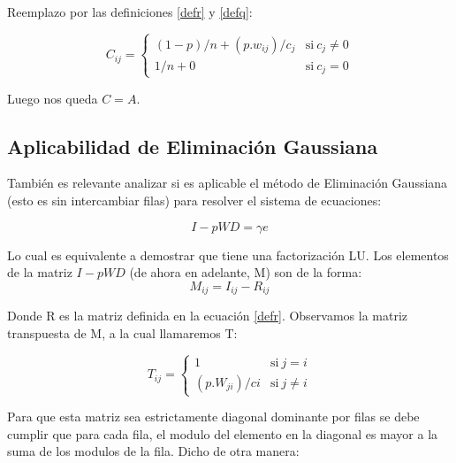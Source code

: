 Reemplazo por las definiciones \ref{defr} y \ref{defq}:

\begin{equation}
	\label{defc}
    C_{ij} = \left\{
            \begin{array}{ll}
                 (1-p)/n + (p.w_{ij})/c_j & \mathrm{si\ } c_j \neq 0 \\
                 1/n + 0                  & \mathrm{si\ } c_j = 0
            \end{array}
        \right.
\end{equation}

Luego nos queda $C=A$. \\
 
\subsection{Aplicabilidad de Eliminación Gaussiana} \label{demAppEG}

También es relevante analizar si es aplicable el método de Eliminación Gaussiana (esto es sin intercambiar filas) para resolver el sistema de ecuaciones:

\begin{equation}
    \label{defSistema}
    I - pWD = \gamma e
\end{equation}

Lo cual es equivalente a demostrar que tiene una factorización LU.     
Los elementos de la matriz $I - pWD$ (de ahora en adelante, M) son de la forma:
\begin{equation}
    \label{defMatriz}
    M_{ij} = I_{ij} - R_{ij}
\end{equation}

Donde R es la matriz definida en la ecuación \ref{defr}. Observamos la matriz transpuesta de M, a la cual llamaremos T:

\begin{equation}
    \label{defT}
    T_{ij} = \left\{
            \begin{array}{ll}
                 1 & \mathrm{si\ } j = i \\
                 (p.W_{ji})/ci & \mathrm{si\ } j \neq i 
            \end{array}
        \right.
\end{equation}

Para que esta matriz sea estrictamente diagonal dominante por filas se debe cumplir que para cada fila, el modulo del elemento en la diagonal es mayor a la suma de los modulos de la fila. Dicho de otra manera:  


